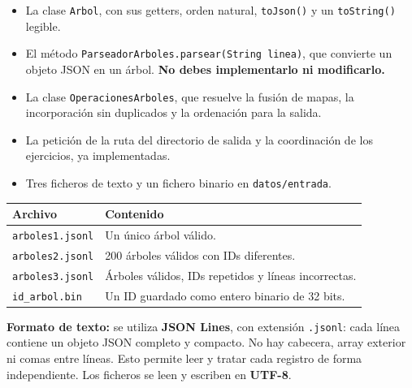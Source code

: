 \documentclass[a4paper,12pt]{article}
\begin{document}
\begin{itemize}
\item La clase \texttt{Arbol}, con sus getters, orden natural, \texttt{toJson()} y un \texttt{toString()} legible.
\item El método \texttt{P\allowbreak{}a\allowbreak{}r\allowbreak{}s\allowbreak{}e\allowbreak{}a\allowbreak{}d\allowbreak{}o\allowbreak{}r\allowbreak{}A\allowbreak{}r\allowbreak{}b\allowbreak{}o\allowbreak{}l\allowbreak{}e\allowbreak{}s\allowbreak{}.\allowbreak{}p\allowbreak{}a\allowbreak{}r\allowbreak{}s\allowbreak{}e\allowbreak{}a\allowbreak{}r\allowbreak{}(\allowbreak{}S\allowbreak{}t\allowbreak{}r\allowbreak{}i\allowbreak{}n\allowbreak{}g\allowbreak{} \allowbreak{}l\allowbreak{}i\allowbreak{}n\allowbreak{}e\allowbreak{}a\allowbreak{})}, que convierte un objeto JSON en un árbol. \textbf{No debes implementarlo ni modificarlo.}
\item La clase \texttt{OperacionesArboles}, que resuelve la fusión de mapas, la incorporación sin duplicados y la ordenación para la salida.
\item La petición de la ruta del directorio de salida y la coordinación de los ejercicios, ya implementadas.
\item Tres ficheros de texto y un fichero binario en \texttt{datos/entrada}.
\end{itemize}

\begin{tabularx}{\textwidth}{|p{4cm}|X|}\hline
\rowcolor{primary} \color{white}\bfseries Archivo & \color{white}\bfseries Contenido \\ \hline
\texttt{arboles1.jsonl} & Un único árbol válido. \\ \hline
\texttt{arboles2.jsonl} & 200 árboles válidos con IDs diferentes. \\ \hline
\texttt{arboles3.jsonl} & Árboles válidos, IDs repetidos y líneas incorrectas. \\ \hline
\texttt{id\_arbol.bin} & Un ID guardado como entero binario de 32 bits. \\ \hline
\end{tabularx}

\textbf{Formato de texto:} se utiliza \textbf{JSON Lines}, con extensión \texttt{.jsonl}: cada línea contiene un objeto JSON completo y compacto. No hay cabecera, array exterior ni comas entre líneas. Esto permite leer y tratar cada registro de forma independiente. Los ficheros se leen y escriben en \textbf{UTF-8}.\par
\end{document}
